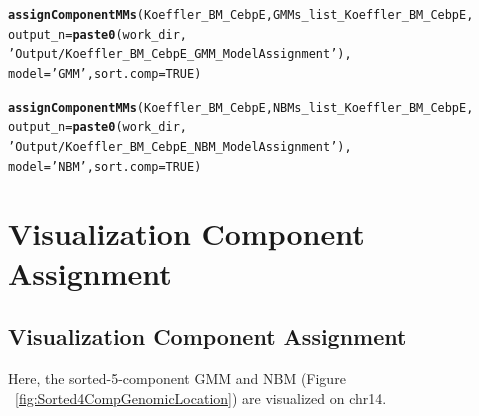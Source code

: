\documentclass{article}\usepackage[]{graphicx}\usepackage[]{color}
\makeatletter
\newcommand{\hlnum}[1]{\textcolor[rgb]{0.686,0.059,0.569}{#1}}%
\newcommand{\hlstr}[1]{\textcolor[rgb]{0.192,0.494,0.8}{#1}}%
\newcommand{\hlstd}[1]{\textcolor[rgb]{0.345,0.345,0.345}{#1}}%
\newcommand{\hlkwc}[1]{\textcolor[rgb]{0.333,0.667,0.333}{#1}}%
\newcommand{\hlkwd}[1]{\textcolor[rgb]{0.737,0.353,0.396}{\textbf{#1}}}%
\newenvironment{kframe}{%
 \def\at@end@of@kframe{}%
 \ifinner\ifhmode%
  \def\at@end@of@kframe{\end{minipage}}%
  \begin{minipage}{\columnwidth}%
 \fi\fi%
 \def\FrameCommand##1{\hskip\@totalleftmargin \hskip-\fboxsep
 \colorbox{shadecolor}{##1}\hskip-\fboxsep
     \hskip-\linewidth \hskip-\@totalleftmargin \hskip\columnwidth}%
 \MakeFramed {\advance\hsize-\width
   \@totalleftmargin\z@ \linewidth\hsize
   \@setminipage}}%
 {\par\unskip\endMakeFramed%
 \at@end@of@kframe}
\newenvironment{knitrout}{}{} %
\makeatother
\begin{document}
\begin{knitrout}
\color{fgcolor}\begin{kframe}
\begin{alltt}
\hlkwd{assignComponentMMs}\hlstd{(Koeffler_BM_CebpE, GMMs_list_Koeffler_BM_CebpE,}
                   \hlkwc{output_n}\hlstd{=}\hlkwd{paste0}\hlstd{(work_dir,}
                    \hlstr{'Output/Koeffler_BM_CebpE_GMM_ModelAssignment'}\hlstd{),}
                    \hlkwc{model}\hlstd{=}\hlstr{'GMM'}\hlstd{,} \hlkwc{sort.comp}\hlstd{=}\hlnum{TRUE}\hlstd{)}
\end{alltt}
\end{kframe}
\end{knitrout}

\begin{knitrout}
\color{fgcolor}\begin{kframe}
\begin{alltt}
\hlkwd{assignComponentMMs}\hlstd{(Koeffler_BM_CebpE, NBMs_list_Koeffler_BM_CebpE,}
                   \hlkwc{output_n}\hlstd{=}\hlkwd{paste0}\hlstd{(work_dir,}
                    \hlstr{'Output/Koeffler_BM_CebpE_NBM_ModelAssignment'}\hlstd{),}
                   \hlkwc{model}\hlstd{=}\hlstr{'NBM'}\hlstd{,} \hlkwc{sort.comp}\hlstd{=}\hlnum{TRUE}\hlstd{)}
\end{alltt}
\end{kframe}
\end{knitrout}

\section{Visualization Component Assignment}
\subsection{Visualization Component Assignment}
Here, the sorted-5-component GMM and NBM (Figure ~\ref{fig:Sorted4CompGenomicLocation}) are visualized on chr14.
\end{document}
